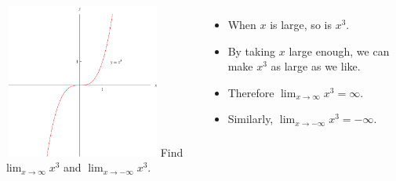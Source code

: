 \begin{frame}
\begin{example}[Example 8, p. 236]
\begin{columns}[c]
\ \includegraphics[width=5cm]{curve-sketching/pictures/01-02-xcubed.pdf}%
%
Find $\lim_{x\to\infty} x^3$ and $\lim_{x\to -\infty} x^3$.
\begin{itemize}
\item<2->  When $x$ is large, so is $x^3$.
\item<3->  By taking $x$ large enough, we can make $x^3$ as large as we like.
\item<4->  Therefore $\lim_{x\to \infty} x^3 = \infty$.
\item<5->  Similarly, $\lim_{x\to -\infty} x^3 = -\infty$.
\end{itemize}
\end{columns}
\end{example}
\end{frame}
